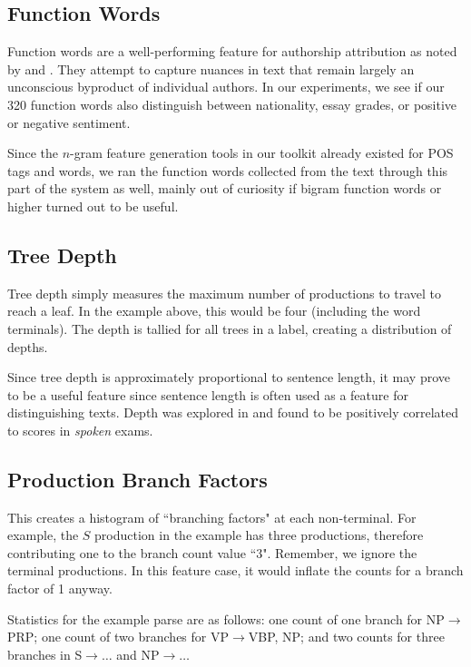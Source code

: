 \documentclass[conference]{IEEEtran}
\begin{document}
\subsection{Function Words}

Function words are a well-performing feature for authorship attribution as noted
by \cite{jasist-stamatatos-2009} and \cite{jasist-koppel-2009}. They attempt to
capture nuances in text that remain largely an unconscious byproduct of
individual authors. In our experiments, we see if our 320 function words also
distinguish between nationality, essay grades, or positive or negative
sentiment.

Since the $n$-gram feature generation tools in our toolkit already existed for
POS tags and words, we ran the function words collected from the
text through this part of the system as well, mainly out of curiosity if bigram
function words or higher turned out to be useful.

\subsection{Tree Depth}

Tree depth simply measures the maximum number of productions to travel to reach
a leaf. In the example above, this would be four (including the word terminals).
The depth is tallied for all trees in a label, creating a distribution of
depths.

Since tree depth is approximately proportional to sentence length, it may prove
to be a useful feature since sentence length is often used as a feature for
distinguishing texts. Depth was explored in \cite{acl-chen-2011} and found to be
positively correlated to scores in \emph{spoken} exams.

\subsection{Production Branch Factors}

This creates a histogram of ``branching factors" at each non-terminal.  For
example, the $S$ production in the example has three productions, therefore
contributing one to the branch count value ``3". Remember, we ignore the
terminal productions. In this feature case, it would inflate the counts for a
branch factor of 1 anyway.

Statistics for the example parse are as follows: one count of one branch for
NP$\rightarrow$PRP; one count of two branches for VP$\rightarrow$VBP, NP; and
two counts for three branches in S$\rightarrow\dots$ and NP$\rightarrow\dots$
\end{document}
